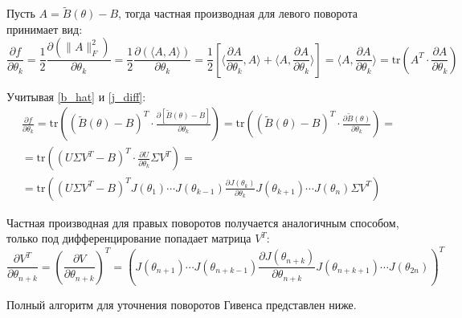 Пусть $A = \tilde{B}(\theta) - B$, тогда частная производная для левого поворота принимает вид:
\begin{equation*}
    \frac{\partial f}{\partial \theta_k} =
    \frac{1}{2}\frac{\partial (\|A\|_F^2)}{\partial \theta_k} =
    \frac{1}{2}\frac{\partial (\langle A, A\rangle)}{\partial \theta_k} =
    \frac{1}{2} \left[ \langle\frac{\partial A}{\partial \theta_k}, A\rangle + \langle A, \frac{\partial A}{\partial \theta_k}\rangle \right]= \langle A, \frac{\partial A}{\partial \theta_k}\rangle = \text{tr}(A^T\cdot\frac{\partial A}{\partial \theta_k})
\end{equation*}

Учитывая \eqref{b_hat} и \eqref{j_diff}:
\begin{equation}
\begin{split}
    \frac{\partial f}{\partial \theta_k} = 
    \text{tr}\left((\tilde{B}(\theta) - B)^T\cdot\frac{\partial [\tilde{B}(\theta) - B]}{\partial \theta_k}\right)=
    \text{tr}\left((\tilde{B}(\theta) - B)^T\cdot\frac{\partial \tilde{B}(\theta)}{\partial \theta_k}\right)
    =\\[6pt] =
    \text{tr}\left((U\Sigma V^T - B)^T\cdot\frac{\partial U}{\partial \theta_k}\Sigma V^T\right) 
    =\\[6pt] =
    \text{tr}\left((U\Sigma V^T - B)^TJ(\theta_1) \cdots  J(\theta_{k-1})\frac{\partial J(\theta_k)}{\partial \theta_k}J(\theta_{k+1}) \cdots J(\theta_n)\Sigma V^T\right)
\end{split}
\end{equation}

\begin{note}
Частная производная для правых поворотов получается аналогичным способом, только под дифференцирование попадает матрица $V^T$:
\begin{equation*}
    \frac{\partial V^T}{\partial \theta_{n+k}} = \left(\frac{\partial V}{\partial \theta_{n+k}}\right)^T = \left(J(\theta_{n+1}) \cdots  J(\theta_{n+k-1})\frac{\partial J(\theta_{n+k})}{\partial \theta_{n+k}}J(\theta_{n+k+1}) \cdots J(\theta_{2n})\right)^T
\end{equation*}
\end{note}

Полный алгоритм для уточнения поворотов Гивенса представлен ниже.

